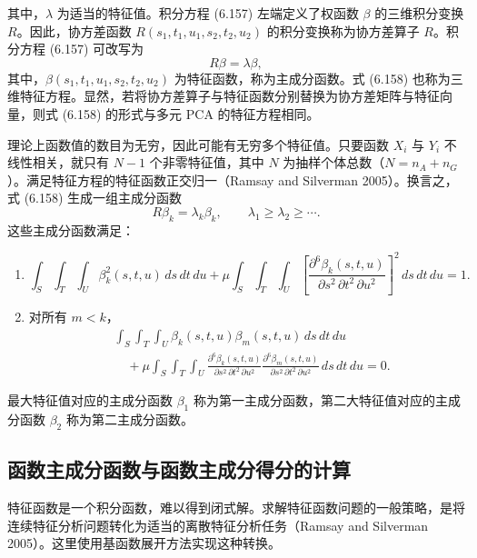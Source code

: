 其中，$\lambda$ 为适当的特征值。积分方程 (6.157) 左端定义了权函数 $\beta$ 的三维积分变换 $R$。因此，协方差函数 $R(s_1,t_1,u_1,s_2,t_2,u_2)$ 的积分变换称为协方差算子 $R$。积分方程 (6.157) 可改写为
\begin{equation}
R\beta=\lambda\beta,
\tag{6.158}
\end{equation}
其中，$\beta(s_1,t_1,u_1,s_2,t_2,u_2)$ 为特征函数，称为主成分函数。式 (6.158) 也称为三维特征方程。显然，若将协方差算子与特征函数分别替换为协方差矩阵与特征向量，则式 (6.158) 的形式与多元 PCA 的特征方程相同。

理论上函数值的数目为无穷，因此可能有无穷多个特征值。只要函数 $X_i$ 与 $Y_i$ 不线性相关，就只有 $N-1$ 个非零特征值，其中 $N$ 为抽样个体总数（$N=n_A+n_G$）。满足特征方程的特征函数正交归一（Ramsay and Silverman 2005）。换言之，式 (6.158) 生成一组主成分函数
\[
R\beta_k=\lambda_k\beta_k,\qquad\lambda_1\geq\lambda_2\geq\cdots.
\]
这些主成分函数满足：
\begin{enumerate}[label=\arabic*.]
\item
\[
\int_S\int_T\int_U\beta_k^2(s,t,u)\,ds\,dt\,du+\mu\int_S\int_T\int_U
\left[\frac{\partial^6\beta_k(s,t,u)}{\partial s^2\,\partial t^2\,\partial u^2}\right]^2\,ds\,dt\,du=1.
\]
\item 对所有 $m<k$，
\[
\begin{aligned}
&\int_S\int_T\int_U\beta_k(s,t,u)\beta_m(s,t,u)\,ds\,dt\,du\\
&\quad+\mu\int_S\int_T\int_U\frac{\partial^6\beta_k(s,t,u)}{\partial s^2\,\partial t^2\,\partial u^2}
\frac{\partial^6\beta_m(s,t,u)}{\partial s^2\,\partial t^2\,\partial u^2}\,ds\,dt\,du=0.
\end{aligned}
\]
\end{enumerate}
最大特征值对应的主成分函数 $\beta_1$ 称为第一主成分函数，第二大特征值对应的主成分函数 $\beta_2$ 称为第二主成分函数。

\subsection{函数主成分函数与函数主成分得分的计算}

特征函数是一个积分函数，难以得到闭式解。求解特征函数问题的一般策略，是将连续特征分析问题转化为适当的离散特征分析任务（Ramsay and Silverman 2005）。这里使用基函数展开方法实现这种转换。

